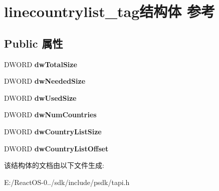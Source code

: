 \hypertarget{structlinecountrylist__tag}{}\section{linecountrylist\+\_\+tag结构体 参考}
\label{structlinecountrylist__tag}
\subsection*{Public 属性}
\begin{DoxyCompactItemize}
\item 
\mbox{\label{structlinecountrylist__tag_a4692f43707011b90a4fbe7ed1a5bef11}} 
D\+W\+O\+RD {\bfseries dw\+Total\+Size}
\item 
\mbox{\label{structlinecountrylist__tag_a7fe40408fc08322712f82fd324c7dba7}} 
D\+W\+O\+RD {\bfseries dw\+Needed\+Size}
\item 
\mbox{\label{structlinecountrylist__tag_abd5cadf9d477023dcd3b1bf66af22ef0}} 
D\+W\+O\+RD {\bfseries dw\+Used\+Size}
\item 
\mbox{\label{structlinecountrylist__tag_a40767f91f90dbd8874d44ba5aef1d558}} 
D\+W\+O\+RD {\bfseries dw\+Num\+Countries}
\item 
\mbox{\label{structlinecountrylist__tag_a9d0eee295cbbfe4c7794383f0307ba9b}} 
D\+W\+O\+RD {\bfseries dw\+Country\+List\+Size}
\item 
\mbox{\label{structlinecountrylist__tag_ac3a2a50d25ab514a2b8ca63dd32e0d35}} 
D\+W\+O\+RD {\bfseries dw\+Country\+List\+Offset}
\end{DoxyCompactItemize}


该结构体的文档由以下文件生成\+:\begin{DoxyCompactItemize}
\item 
E\+:/\+React\+O\+S-\/0../sdk/include/psdk/tapi.\+h\end{DoxyCompactItemize}
